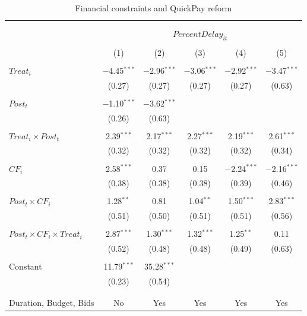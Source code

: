 \documentclass[
]{article}
\begin{document}
\begin{table}[H] \centering 
  \caption{Financial constraints and QuickPay reform} 
  \label{} 
\small 
\begin{tabular}{@{\extracolsep{-2pt}}lccccc} 
\\[-1.8ex]\hline 
\hline \\[-1.8ex] 
\\[-1.8ex] & \multicolumn{5}{c}{$PercentDelay_{it}$  } \\ 
\\[-1.8ex] & (1) & (2) & (3) & (4) & (5)\\ 
\hline \\[-1.8ex] 
 $Treat_i$ & $-$4.45$^{***}$ & $-$2.96$^{***}$ & $-$3.06$^{***}$ & $-$2.92$^{***}$ & $-$3.47$^{***}$ \\ 
  & (0.27) & (0.27) & (0.27) & (0.27) & (0.63) \\ 
  & & & & & \\ 
 $Post_t$ & $-$1.10$^{***}$ & $-$3.62$^{***}$ &  &  &  \\ 
  & (0.26) & (0.63) &  &  &  \\ 
  & & & & & \\ 
 $Treat_i \times Post_t$ & 2.39$^{***}$ & 2.17$^{***}$ & 2.27$^{***}$ & 2.19$^{***}$ & 2.61$^{***}$ \\ 
  & (0.32) & (0.32) & (0.32) & (0.32) & (0.34) \\ 
  & & & & & \\ 
 $CF_i$ & 2.58$^{***}$ & 0.37 & 0.15 & $-$2.24$^{***}$ & $-$2.16$^{***}$ \\ 
  & (0.38) & (0.38) & (0.38) & (0.39) & (0.46) \\ 
  & & & & & \\ 
 $Post_t \times CF_i$ & 1.28$^{**}$ & 0.81 & 1.04$^{**}$ & 1.50$^{***}$ & 2.83$^{***}$ \\ 
  & (0.51) & (0.50) & (0.51) & (0.51) & (0.56) \\ 
  & & & & & \\ 
 $Post_t \times CF_i \times Treat_i$ & 2.87$^{***}$ & 1.30$^{***}$ & 1.32$^{***}$ & 1.25$^{**}$ & 0.11 \\ 
  & (0.52) & (0.48) & (0.48) & (0.49) & (0.63) \\ 
  & & & & & \\ 
 Constant & 11.79$^{***}$ & 35.28$^{***}$ &  &  &  \\ 
  & (0.23) & (0.54) &  &  &  \\ 
  & & & & & \\ 
\hline \\[-1.8ex] 
Duration, Budget, Bids & No & Yes & Yes & Yes & Yes \\ 

\end{tabular}
\end{table}
\end{document}
